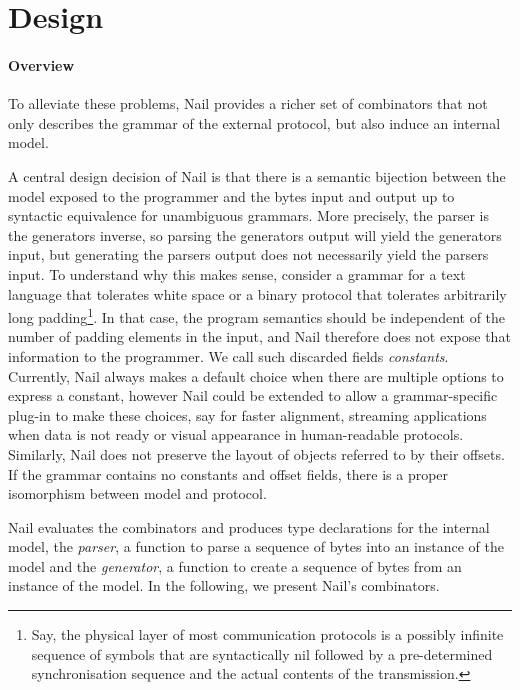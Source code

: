 \section{Design}
\label{s:design}

\paragraph{Overview}

To alleviate these problems, Nail provides a richer set of combinators that not
only describes the grammar of the external protocol, but also induce an internal
model.

A central design decision of Nail is that there is a semantic bijection between
the model exposed to the programmer and the bytes input and output up to
syntactic equivalence for unambiguous grammars. More precisely, the parser is
the generators inverse, so parsing the generators output will yield the
generators input, but generating the parsers output does not necessarily yield
the parsers input. To understand why this makes sense, consider a grammar for a
text language that tolerates white space or a binary protocol that tolerates
arbitrarily long padding\footnote{Say, the physical layer of most communication
  protocols is a possibly infinite sequence of symbols that are syntactically
  nil followed by a pre-determined synchronisation sequence and the actual
  contents of the transmission.}. In that case, the program semantics should be
independent of the number of padding elements in the input, and Nail therefore
does not expose that information to the programmer. We call such discarded
fields \emph{constants}. Currently, Nail always makes a default choice when
there are multiple options to express a constant, however Nail could be extended
to allow a grammar-specific plug-in to make these choices, say for faster
alignment, streaming applications when data is not ready or visual appearance in
human-readable protocols. Similarly, Nail does not preserve the layout of
objects referred to by their offsets. If the grammar contains no constants and
offset fields, there is a proper isomorphism between model and protocol.


Nail evaluates the combinators and produces type declarations for the internal
model, the \textit{parser}, a function to parse a sequence of bytes into an
instance of the model and the \textit{generator}, a function to create a
sequence of bytes from an instance of the model. In the following, we present
Nail's combinators.

